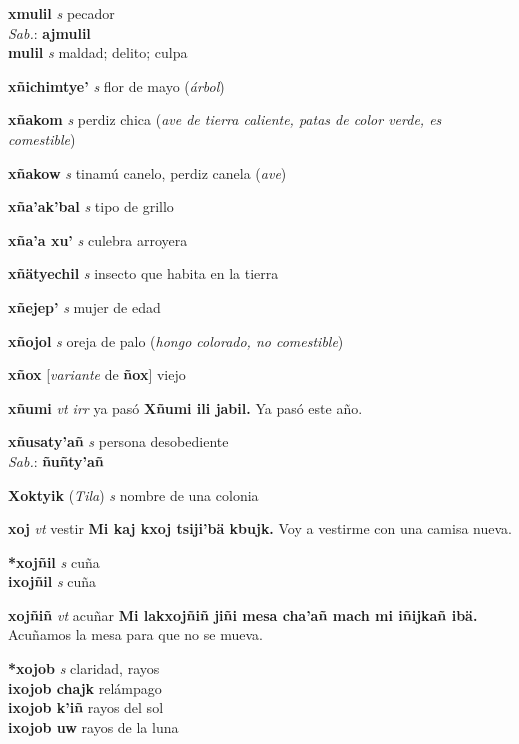 \documentclass[10pt]{scrbook}
\newcommand{\entry}[1]{\textbf{#1}}
\newcommand{\partofspeech}[1]{\textit{#1}}
\newcommand{\spanishtranslation}[1]{#1}
\newcommand{\clarification}[1]{(\textit{#1})}
\newcommand{\cholexample}[1]{\textbf{#1}}
\newcommand{\exampletranslation}[1]{#1}
\newcommand{\dialectvariant}[1]{\\\textit{#1}:}
\newcommand{\dialectword}[1]{\textbf{#1}}
\newcommand{\relevantdialect}[1]{(\textit{#1})}
\newcommand{\secondaryentry}[1]{\\\textbf{#1}}
\newcommand{\secondpartofspeech}[1]{\textit{#1}}
\newcommand{\secondtranslation}[1]{#1}
\newcommand{\conjugationtense}[1]{[\textit{#1}}
\newcommand{\conjugationverb}[1]{de \textbf{#1}]}
\begin{document}
\begin{multicols}{2}
\entry{xmulil}
\partofspeech{s}
\spanishtranslation{pecador}
\dialectvariant{Sab.}
\dialectword{ajmulil}
\secondaryentry{mulil}
\secondpartofspeech{s}
\secondtranslation{maldad; delito; culpa}

\entry{xñichimtye'}
\partofspeech{s}
\spanishtranslation{flor de mayo}
\clarification{árbol}

\entry{xñakom}
\partofspeech{s}
\spanishtranslation{perdiz chica}
\clarification{ave de tierra caliente, patas de color verde, es comestible}

\entry{xñakow}
\partofspeech{s}
\spanishtranslation{tinamú canelo, perdiz canela}
\clarification{ave}

\entry{xña'ak'bal}
\partofspeech{s}
\spanishtranslation{tipo de grillo}

\entry{xña'a xu'}
\partofspeech{s}
\spanishtranslation{culebra arroyera}

\entry{xñätyechil}
\partofspeech{s}
\spanishtranslation{insecto que habita en la tierra}

\entry{xñejep'}
\partofspeech{s}
\spanishtranslation{mujer de edad}

\entry{xñojol}
\partofspeech{s}
\spanishtranslation{oreja de palo}
\clarification{hongo colorado, no comestible}

\entry{xñox}
\conjugationtense{variante}
\conjugationverb{ñox}
\spanishtranslation{viejo}

\entry{xñumi}
\partofspeech{vt irr}
\spanishtranslation{ya pasó}
\cholexample{Xñumi ili jabil.}
\exampletranslation{Ya pasó este año.}

\entry{xñusaty'añ}
\partofspeech{s}
\spanishtranslation{persona desobediente}
\dialectvariant{Sab.}
\dialectword{ñuñty'añ}

\entry{Xoktyik}
\relevantdialect{Tila}
\partofspeech{s}
\spanishtranslation{nombre de una colonia}

\entry{xoj}
\partofspeech{vt}
\spanishtranslation{vestir}
\cholexample{Mi kaj kxoj tsiji'bä kbujk.}
\exampletranslation{Voy a vestirme con una camisa nueva.}

\entry{*xojñil}
\partofspeech{s}
\spanishtranslation{cuña}
\secondaryentry{ixojñil}
\secondpartofspeech{s}
\secondtranslation{cuña}

\entry{xojñiñ}
\partofspeech{vt}
\spanishtranslation{acuñar}
\cholexample{Mi lakxojñiñ jiñi mesa cha'añ mach mi iñijkañ ibä.}
\exampletranslation{Acuñamos la mesa para que no se mueva.}

\entry{*xojob}
\partofspeech{s}
\spanishtranslation{claridad, rayos}
\secondaryentry{ixojob chajk}
\secondtranslation{relámpago}
\secondaryentry{ixojob k'iñ}
\secondtranslation{rayos del sol}
\secondaryentry{ixojob uw}
\secondtranslation{rayos de la luna}


\end{multicols}
\end{document}
